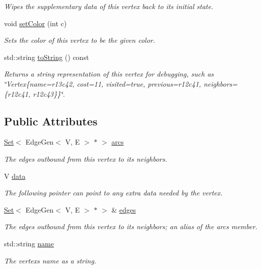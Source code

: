 \begin{DoxyCompactItemize}
\begin{DoxyCompactList}\small\item\em Wipes the supplementary data of this vertex back to its initial state. \end{DoxyCompactList}\item 
void \mbox{\hyperlink{classVertexGen_a5551ca73ea9118c8dc6dbfd26e72e3d6}{set\+Color}} (int c)
\begin{DoxyCompactList}\small\item\em Sets the color of this vertex to be the given color. \end{DoxyCompactList}\item 
std\+::string \mbox{\hyperlink{classVertexGen_a1fe5121d6528fdea3f243321b3fa3a49}{to\+String}} () const
\begin{DoxyCompactList}\small\item\em Returns a string representation of this vertex for debugging, such as \char`\"{}\+Vertex\{name=r13c42, cost=11, visited=true, previous=r12c41, neighbors=\{r12c41, r12c43\}\}\char`\"{}. \end{DoxyCompactList}\end{DoxyCompactItemize}
\subsection*{Public Attributes}
\begin{DoxyCompactItemize}
\item 
\mbox{\hyperlink{classstanfordcpplib_1_1collections_1_1GenericSet}{Set}}$<$ Edge\+Gen$<$ V, E $>$ $\ast$ $>$ \mbox{\hyperlink{classVertexGen_aa0cee1fcace4fca3db468e83aa4672fe}{arcs}}
\begin{DoxyCompactList}\small\item\em The edges outbound from this vertex to its neighbors. \end{DoxyCompactList}\item 
V \mbox{\hyperlink{classVertexGen_a0cff2e152738a487e0930e21b7824c40}{data}}
\begin{DoxyCompactList}\small\item\em The following pointer can point to any extra data needed by the vertex. \end{DoxyCompactList}\item 
\mbox{\hyperlink{classstanfordcpplib_1_1collections_1_1GenericSet}{Set}}$<$ Edge\+Gen$<$ V, E $>$ $\ast$ $>$ \& \mbox{\hyperlink{classVertexGen_a795e7fd80b24c26fdd9fa879db40a403}{edges}}
\begin{DoxyCompactList}\small\item\em The edges outbound from this vertex to its neighbors; an alias of the \textquotesingle{}arcs\textquotesingle{} member. \end{DoxyCompactList}\item 
std\+::string \mbox{\hyperlink{classVertexGen_a9b45b3e13bd9167aab02e17e08916231}{name}}
\begin{DoxyCompactList}\small\item\em The vertex\textquotesingle{}s name as a string. \end{DoxyCompactList}\end{DoxyCompactItemize}


